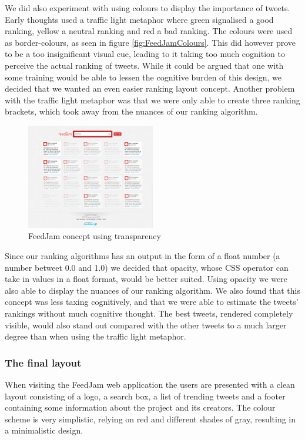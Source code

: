 We did also experiment with using colours to display the importance of tweets. Early thoughts used a traffic light metaphor where green signalised a good ranking, yellow a neutral ranking and red a bad ranking. The colours were used as border-colours, as seen in figure  \ref{fig:FeedJamColours}. This did however prove to be a too insignificant visual cue, leading to it taking too much cognition to perceive the actual ranking of tweets. While it could be argued that one with some training would be able to lessen the cognitive burden of this design, we decided that we wanted an even easier ranking layout concept. Another problem  with the traffic light metaphor was that we were only able to create three ranking brackets, which took away from the nuances of our ranking algorithm.

\begin{figure}[ht]
    \begin{minipage}[b]{1\linewidth}
        \centering
        \includegraphics[width=0.5\textwidth]{figures/layout_transparency}
        \caption{FeedJam concept using transparency}
        \label{fig:FeedJamTransparency}
    \end{minipage}
\end{figure}

Since our ranking algorithms has an output in the form of a float number (a number betweet 0.0 and 1.0) we decided that opacity, whose CSS operator can take in values in a float format, would be better suited. Using opacity we were also able to display the nuances of our ranking algorithm. We also found that this concept was less taxing cognitively, and that we were able to estimate the tweets' rankings without much cognitive thought. The best tweets, rendered completely visible, would also stand out compared with the other tweets to a much larger degree than when using the traffic light metaphor.

\subsubsection{The final layout}
When visiting the FeedJam web application the users are presented with a clean layout consisting of a logo, a search box, a list of trending tweets and a footer containing some information about the project and its creators. The colour scheme is very simplistic, relying on red and different shades of gray, resulting in a minimalistic design.

